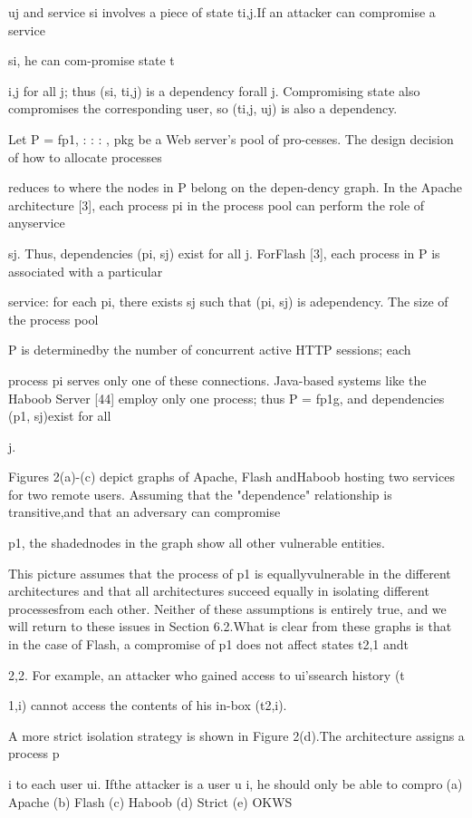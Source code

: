 uj and service si involves a piece of state ti,j.If an attacker can compromise a service

si, he can com-promise state t

i,j for all j; thus (si, ti,j) is a dependency forall j. Compromising state also compromises the corresponding user, so (ti,j, uj) is also a dependency.

Let P = fp1, : : : , pkg be a Web server's pool of pro-cesses. The design decision of how to allocate processes

reduces to where the nodes in P belong on the depen-dency graph. In the Apache architecture [3], each process pi in the process pool can perform the role of anyservice

sj. Thus, dependencies (pi, sj) exist for all j. ForFlash [3], each process in P is associated with a particular

service: for each pi, there exists sj such that (pi, sj) is adependency. The size of the process pool

P is determinedby the number of concurrent active HTTP sessions; each

process pi serves only one of these connections. Java-based systems like the Haboob Server [44] employ only
one process; thus P = fp1g, and dependencies (p1, sj)exist for all

j.

Figures 2(a)-(c) depict graphs of Apache, Flash andHaboob hosting two services for two remote users. Assuming that the "dependence" relationship is transitive,and that an adversary can compromise

p1, the shadednodes in the graph show all other vulnerable entities.

This picture assumes that the process of p1 is equallyvulnerable in the different architectures and that all architectures succeed equally in isolating different processesfrom each other. Neither of these assumptions is entirely
true, and we will return to these issues in Section 6.2.What is clear from these graphs is that in the case of
Flash, a compromise of p1 does not affect states t2,1 andt

2,2. For example, an attacker who gained access to ui'ssearch history (t

1,i) cannot access the contents of his in-box
(t2,i).

A more strict isolation strategy is shown in Figure 2(d).The architecture assigns a process p

i to each user ui. Ifthe attacker is a user u
i, he should only be able to compro(a) Apache (b) Flash (c) Haboob (d) Strict (e) OKWS


